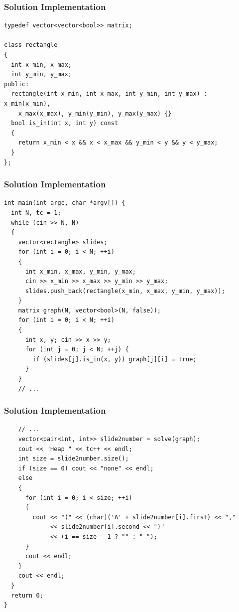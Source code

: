 \documentclass{beamer}
\newcommand{\uvalink}[2]{UVa Online Judge (http://uva.onlinejudge.org)
  problem number \href{#2}{\textcolor{blue}{#1}.}}
\newcounter{exo}
\newcommand{\exo}{
  \addtocounter{exo}{1}
  Exercice \arabic{exo}
}
\begin{document}
\fi


\ifanswers

\begin{frame}[containsverbatim]
\frametitle{Solution Implementation}
\scriptsize

\begin{lstlisting}
typedef vector<vector<bool>> matrix;

class rectangle
{
  int x_min, x_max;
  int y_min, y_max;
public:
  rectangle(int x_min, int x_max, int y_min, int y_max) : x_min(x_min),
    x_max(x_max), y_min(y_min), y_max(y_max) {}
  bool is_in(int x, int y) const
  {
    return x_min < x && x < x_max && y_min < y && y < y_max;
  }
};
\end{lstlisting}

\end{frame}

\begin{frame}[containsverbatim]
\frametitle{Solution Implementation}
\scriptsize

\begin{lstlisting}
int main(int argc, char *argv[]) {
  int N, tc = 1;
  while (cin >> N, N)
  {
    vector<rectangle> slides;
    for (int i = 0; i < N; ++i)
    {
      int x_min, x_max, y_min, y_max;
      cin >> x_min >> x_max >> y_min >> y_max;
      slides.push_back(rectangle(x_min, x_max, y_min, y_max));
    }
    matrix graph(N, vector<bool>(N, false));
    for (int i = 0; i < N; ++i)
    {
      int x, y; cin >> x >> y;
      for (int j = 0; j < N; ++j) {
        if (slides[j].is_in(x, y)) graph[j][i] = true;
      }
    }
    // ...
\end{lstlisting}

\end{frame}

\begin{frame}[containsverbatim]
\frametitle{Solution Implementation}
\scriptsize

\begin{lstlisting}
    // ...
    vector<pair<int, int>> slide2number = solve(graph);
    cout << "Heap " << tc++ << endl;
    int size = slide2number.size();
    if (size == 0) cout << "none" << endl;
    else
    {
      for (int i = 0; i < size; ++i)
      {
        cout << "(" << (char)('A' + slide2number[i].first) << ","
             << slide2number[i].second << ")"
             << (i == size - 1 ? "" : " ");
      }
      cout << endl;
    }
    cout << endl;
  }
  return 0;
}
\end{lstlisting}

\end{frame}
\end{document}

